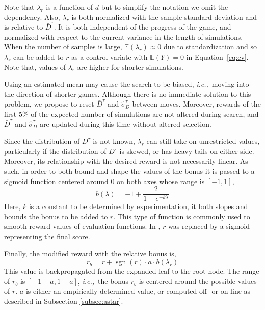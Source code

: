 \documentclass{ecai2014}
\newcommand{\sgn}{\mathop{\mathrm{sgn}}}
\newcommand{\ie}{{\it i.e.,}~}
\newcommand{\E}[1]{\mathbb{E}\left( #1 \right)}
\begin{document}
Note that $\lambda_r$ is a function of $d$ but to simplify the notation we omit the dependency. 
Also, $\lambda_r$ is both normalized with the sample standard deviation and is relative to $\bar{D}^\tau$. It is both independent of the progress of the game, and normalized with respect to the current variance in the length of simulations. When the number of samples is large, $\E{\lambda_r} \approx 0$ due to standardization and so $\lambda_r$ can be added to $r$ as a control variate with $\E{Y} = 0$ in Equation~\ref{eq:cv}. Note that, values of $\lambda_r$ are higher for shorter simulations.

Using an estimated mean may cause the search to be biased, \ie moving into the direction of shorter games. Although there is no immediate solution to this problem, we propose to reset $\bar{D}^\tau$ and $\hat{\sigma}^\tau_D$ between moves. Moreover, rewards of the first $5\%$ of the expected number of simulations are not altered during search, and $\bar{D}^\tau$ and $\hat{\sigma}^\tau_D$ are updated during this time without altered selection.

Since the distribution of $D^\tau$ is not known, $\lambda_r$ can still take on unrestricted values, particularly if the distribution of $D^\tau$ is skewed, or has heavy tails on either side. Moreover, its relationship with the desired reward is not necessarily linear. As such, in order to both bound and shape the values of the bonus it is passed to a sigmoid function centered around $0$ on both axes whose range is $[-1,1]$,
\begin{equation}
b(\lambda)=-1+\frac{2}{1+e^{-k\lambda}}
\label{eq:sigmoid}
\end{equation}
Here, $k$ is a constant to be determined by experimentation, it both slopes and bounds the bonus to be added to $r$. This type of function is commonly used to smooth reward values of evaluation functions. In \cite{shibahara2008combining}, $r$ was replaced by a sigmoid representing the final score.

Finally, the modified reward with the relative bonus is, 
\begin{equation}
r_b=r+\sgn(r) \cdot a \cdot b(\lambda_r)
\label{eq:rb}
\end{equation}
This value is backpropagated from the expanded leaf to the root node. The range of $r_b$ is $[-1-a, 1+a]$, \ie the bonus $r_b$ is centered around the possible values of $r$. $a$ is either an empirically determined value, or computed off- or on-line as described in Subsection \ref{subsec:astar}.
\end{document}
